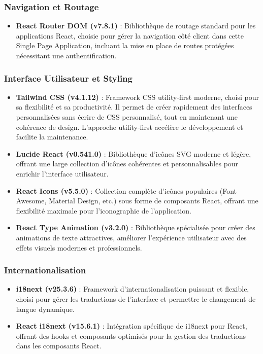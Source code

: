 \subsubsection{Navigation et Routage}

\begin{itemize}
    \item \textbf{React Router DOM (v7.8.1)} : Bibliothèque de routage standard pour les applications React, choisie pour gérer la navigation côté client dans cette Single Page Application, incluant la mise en place de routes protégées nécessitant une authentification.
\end{itemize}

\subsubsection{Interface Utilisateur et Styling}

\begin{itemize}
    \item \textbf{Tailwind CSS (v4.1.12)} : Framework CSS utility-first moderne, choisi pour sa flexibilité et sa productivité. Il permet de créer rapidement des interfaces personnalisées sans écrire de CSS personnalisé, tout en maintenant une cohérence de design. L'approche utility-first accélère le développement et facilite la maintenance.

    \item \textbf{Lucide React (v0.541.0)} : Bibliothèque d'icônes SVG moderne et légère, offrant une large collection d'icônes cohérentes et personnalisables pour enrichir l'interface utilisateur.

    \item \textbf{React Icons (v5.5.0)} : Collection complète d'icônes populaires (Font Awesome, Material Design, etc.) sous forme de composants React, offrant une flexibilité maximale pour l'iconographie de l'application.

    \item \textbf{React Type Animation (v3.2.0)} : Bibliothèque spécialisée pour créer des animations de texte attractives, améliorer l'expérience utilisateur avec des effets visuels modernes et professionnels.
\end{itemize}

\subsubsection{Internationalisation}

\begin{itemize}
    \item \textbf{i18next (v25.3.6)} : Framework d'internationalisation puissant et flexible, choisi pour gérer les traductions de l'interface et permettre le changement de langue dynamique.

    \item \textbf{React i18next (v15.6.1)} : Intégration spécifique de i18next pour React, offrant des hooks et composants optimisés pour la gestion des traductions dans les composants React.
\end{itemize}

